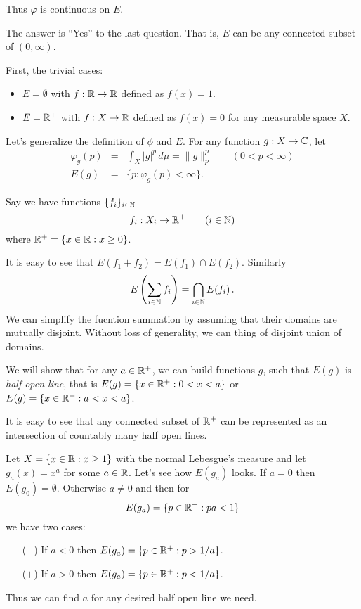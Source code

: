 \begin{enumerate}
\begin{itemize}
  Thus \(\varphi\) is continuous on $E$.

  The answer is ``Yes'' to the last question. That is, $E$
  can be any connected subset of \((0,\infty)\).

  First, the trivial cases:
  \begin{itemize}
  \item \(E=\emptyset\) with \(f:\mathbb{R}\to\mathbb{R}\) defined as \(f(x)=1\).
  \item \(E=\mathbb{R}^+\) with \(f:X\to\mathbb{R}\) defined as \(f(x)=0\)
        for any measurable space $X$.
  \end{itemize}

  Let's generalize the definition of \(\phi\) and $E$.
  For any function \(g:X\to\mathbb{C}\), let
  \begin{eqnarray*}
   \varphi_g(p) &=& \int_X |g|^p\,d\mu = \|g\|_p^p \qquad (0<p<\infty) \\
   E(g) &=& \{p: \varphi_g(p)<\infty\}.
  \end{eqnarray*}

  Say we have functions
 \(\{f_i\}_{i\in\mathbb{N}}\)
  \begin{equation*}
   f_i: X_i \to \mathbb{R}^+ \qquad(i\in\mathbb{N})
  \end{equation*}
  where \(\mathbb{R}^+ = \{x\in\mathbb{R}: x\geq0\}\).

  It is easy to see that \(E(f_1 + f_2) = E(f_1) \cap E(f_2)\).
  Similarly
  \begin{equation*}
  E\left(\sum_{i\in\mathbb{N}} f_i\right) = \bigcap_{i\in\mathbb{N}} E(f_i)\,.
  \end{equation*}
  We can simplify the fucntion summation by assuming that
  their domains are mutually disjoint. Without loss of generality,
  we can thing of disjoint union of domains.

  We will show that for any \(a\in\mathbb{R}^+\),
  we can build functions $g$, such that \(E(g)\)
  is \emph{half open line}, that is
  \(E(g) = \{x\in\mathbb{R}^+: 0<x<a\}\) or
  \(E(g) = \{x\in\mathbb{R}^+: a<x<a\}\).

  It is easy to see that any connected subset of \(\mathbb{R}^+\) can
  be represented as an intersection of countably many half open lines.


  Let \(X=\{x\in\mathbb{R}: x\geq 1\}\) with the normal Lebesgue's measure and let
  \(g_a(x) = x^a\) for some \(a\in\mathbb{R}\). Let's see how \(E(g_a)\) looks.
  If \(a=0\) then \(E(g_0) = \emptyset\).
  Otherwise \(a\neq 0\) and then for
  \begin{equation*}
  E(g_a) = \{p\in \mathbb{R}^+: pa < 1\}
  \end{equation*}
  we have two cases:
  \begin{itemize}
   \item[($-$)] If \(a<0\) then \(E(g_a) = \{p\in\mathbb{R}^+: p > 1/a\}\).
   \item[($+$)] If \(a>0\) then \(E(g_a) = \{p\in\mathbb{R}^+: p < 1/a\}\).
  \end{itemize}
  Thus we can find $a$ for any desired half open line we need.


\end{itemize}
\end{enumerate}
